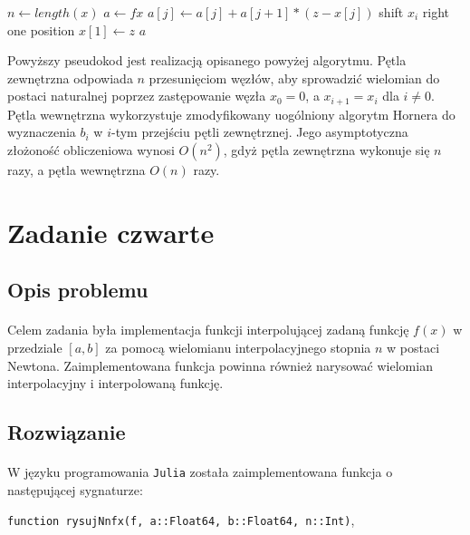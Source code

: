 \documentclass[a4paper]{article}
\theoremstyle{plain}
\begin{document}
\begin{center}
	\begin{algorithmic}[1]
		\State $n \gets length(x)$
    	\State $a \gets fx$
	    		\State $a[j] \gets a[j] + a[j + 1] * (z - x[j])$
	    	\EndFor
	    	\State shift $x_{i}$ right one position
	    	\State $x[1] \gets z$
    	\EndFor
    	\State \Return $a$
	\EndFunction
	\end{algorithmic}
\end{center}

Powyższy pseudokod jest realizacją opisanego powyżej algorytmu. Pętla zewnętrzna odpowiada $n$ przesunięciom węzłów, aby sprowadzić wielomian do postaci naturalnej poprzez zastępowanie węzła $x_{0} = 0$, a $x_{i + 1} = x_{i}$ dla $i \neq 0$. Pętla wewnętrzna wykorzystuje zmodyfikowany uogólniony algorytm Hornera do wyznaczenia $b_{i}$ w $i$-tym przejściu pętli zewnętrznej. Jego asymptotyczna złożoność obliczeniowa wynosi $O(n^2)$, gdyż pętla zewnętrzna wykonuje się $n$ razy, a pętla wewnętrzna $O(n)$ razy.

\section{Zadanie czwarte}

\subsection{Opis problemu}
\paragraph{}
Celem zadania była implementacja funkcji interpolującej zadaną funkcję $f(x)$ w przedziale $[a, b]$ za pomocą wielomianu interpolacyjnego stopnia $n$ w postaci Newtona. Zaimplementowana funkcja powinna również narysować wielomian interpolacyjny i interpolowaną funkcję.

\subsection{Rozwiązanie}
\paragraph{}
W języku programowania \texttt{Julia} została zaimplementowana funkcja o następującej sygnaturze:
\begin{center}
\texttt{function rysujNnfx(f, a::Float64, b::Float64, n::Int)},
\end{center}
\end{document}
